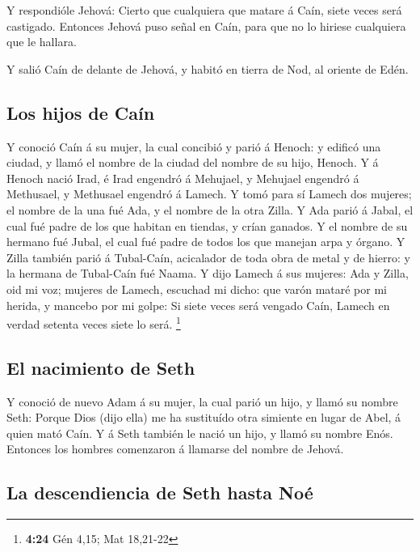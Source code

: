 Y respondióle Jehová: Cierto que cualquiera que matare á
Caín, siete veces será castigado. Entonces Jehová puso señal en Caín,
para que no lo hiriese cualquiera que le hallara.

 Y salió Caín de delante de Jehová, y habitó en tierra de
Nod, al oriente de Edén.

\hypertarget{los-hijos-de-cauxedn}{%
\subsection{Los hijos de Caín}\label{los-hijos-de-cauxedn}}

 Y conoció Caín á su mujer, la cual concibió y parió á
Henoch: y edificó una ciudad, y llamó el nombre de la ciudad del nombre
de su hijo, Henoch.  Y á Henoch nació Irad, é Irad engendró
á Mehujael, y Mehujael engendró á Methusael, y Methusael engendró á
Lamech.  Y tomó para sí Lamech dos mujeres; el nombre de la
una fué Ada, y el nombre de la otra Zilla.  Y Ada parió á
Jabal, el cual fué padre de los que habitan en tiendas, y crían ganados.
 Y el nombre de su hermano fué Jubal, el cual fué padre de
todos los que manejan arpa y órgano.  Y Zilla también parió
á Tubal-Caín, acicalador de toda obra de metal y de hierro: y la hermana
de Tubal-Caín fué Naama.  Y dijo Lamech á sus mujeres: Ada
y Zilla, oid mi voz; mujeres de Lamech, escuchad mi dicho: que varón
mataré por mi herida, y mancebo por mi golpe:  Si siete
veces será vengado Caín, Lamech en verdad setenta veces siete lo será.
\footnote{\textbf{4:24} Gén 4,15; Mat 18,21-22}

\hypertarget{el-nacimiento-de-seth}{%
\subsection{El nacimiento de Seth}\label{el-nacimiento-de-seth}}

 Y conoció de nuevo Adam á su mujer, la cual parió un hijo,
y llamó su nombre Seth: Porque Dios (dijo ella) me ha sustituído otra
simiente en lugar de Abel, á quien mató Caín.  Y á Seth
también le nació un hijo, y llamó su nombre Enós. Entonces los hombres
comenzaron á llamarse del nombre de Jehová.

\hypertarget{la-descendiencia-de-seth-hasta-nouxe9}{%
\subsection{La descendiencia de Seth hasta
Noé}\label{la-descendiencia-de-seth-hasta-nouxe9}}

